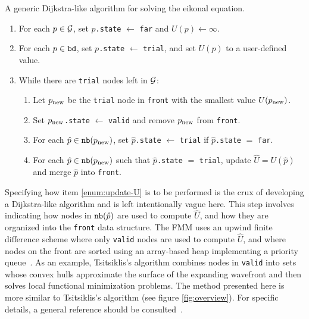 \documentclass[smallcondensed]{svjour3}
\begin{document}
\begin{algorithm}
  \caption{A generic Dijkstra-like algorithm for solving the eikonal
    equation.}\label{alg:dijkstra-like}
  \begin{enumerate}[nolistsep]
  \item For each $p \in \mathcal{G}$, set $p$\texttt{.state} $\gets$
    \texttt{far} and $U(p) \gets \infty$.
  \item For each $p \in \texttt{bd}$, set $p$\texttt{.state} $\gets$
    \texttt{trial}, and set $U(p)$ to a user-defined value.
  \item While there are \texttt{trial} nodes left in $\mathcal{G}$:
    \begin{enumerate}[nolistsep]
    \item Let $p_{\operatorname{new}}$ be the \texttt{trial} node in \texttt{front}
      with the smallest value $U(p_{\operatorname{new}})$.\label{enum:get-node}
    \item Set $p_{\operatorname{new}}$\texttt{.state} $\gets$ \texttt{valid} and remove
      $p_{\operatorname{new}}$ from \texttt{front}.
    \item For each $\hat{p} \in \texttt{nb}(p_{\operatorname{new}})$, set
      $\hat{p}$\texttt{.state} $\gets$ \texttt{trial} if
      $\hat{p}$\texttt{.state} $=$ \texttt{far}.\label{enum:set-trial}
    \item For each $\hat{p} \in \texttt{nb}(p_{\operatorname{new}})$ such that
      $\hat{p}$\texttt{.state} $=$ \texttt{trial}, update
      $\hat{U} = U(\hat{p})$ and merge $\hat{p}$ into
      \texttt{front}.\label{enum:update-U}
    \end{enumerate}
  \end{enumerate}
\end{algorithm}

Specifying how item \ref{enum:update-U} is to be performed is the crux
of developing a Dijkstra-like algorithm and is left intentionally
vague here. This step involves indicating how nodes in
$\texttt{nb}(\hat{p})$ are used to compute $\hat{U}$, and how they are
organized into the \texttt{front} data structure. The FMM uses an
upwind finite difference scheme where only \texttt{valid} nodes are
used to compute $\hat{U}$, and where nodes on the front are sorted
using an array-based heap implementing a priority
queue~\cite{sethian1996fast}. As an example, Tsitsiklis's algorithm
combines nodes in \texttt{valid} into sets whose convex hulls
approximate the surface of the expanding wavefront and then solves
local functional minimization problems. The method presented here is
more similar to Tsitsiklis's algorithm (see figure
\ref{fig:overview}). For specific details, a general reference should
be consulted~\cite{sethian1999level}.
\end{document}
